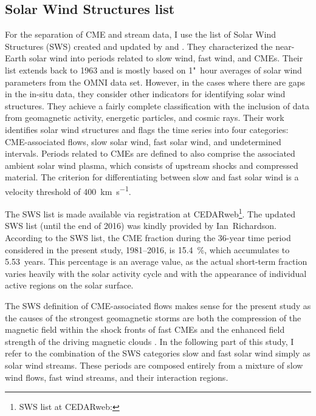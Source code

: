 \subsection{Solar Wind Structures list}
For the separation of CME and stream data, I use the list of Solar Wind Structures (SWS) created and updated by \citet{Richardson2000} and \citet{Richardson2012}. They characterized the near-Earth solar wind into periods related to slow wind, fast wind, and CMEs. Their list extends back to 1963 and is mostly based on 1"~hour averages of solar wind parameters from the OMNI data set. However, in the cases where there are gaps in the in-situ data, they consider other indicators for identifying solar wind structures. They achieve a fairly complete classification with the inclusion of data from geomagnetic activity, energetic particles, and cosmic rays.
Their work identifies solar wind structures and flags the time series into four categories: CME-associated flows, slow solar wind, fast solar wind, and undetermined intervals. Periods related to CMEs are defined to also comprise the associated ambient solar wind plasma, which consists of upstream shocks and compressed material. The criterion for differentiating between slow and fast solar wind is a velocity threshold of \SI{400}{\km\per\s}.

The SWS list is made available via registration at CEDARweb\footnote{SWS list at CEDARweb: }. The updated SWS list (until the end of 2016) was kindly provided by Ian~Richardson.
According to the SWS list, the CME fraction during the 36-year time period considered in the present study, 1981--2016, is \SI{15.4}{\%}, which accumulates to 5.53~years. %
This percentage is an average value, as the actual short-term fraction varies heavily with the solar activity cycle and with the appearance of individual active regions on the solar surface.

The SWS definition of CME-associated flows makes sense for the present study as the causes of the strongest geomagnetic storms are both the compression of the magnetic field within the shock fronts of fast CMEs and the enhanced field strength of the driving magnetic clouds \citep{Bothmer1995}. In the following part of this study, I refer to the combination of the SWS categories slow and fast solar wind simply as solar wind streams. These periods are composed entirely from a mixture of slow wind flows, fast wind streams, and their interaction regions.

